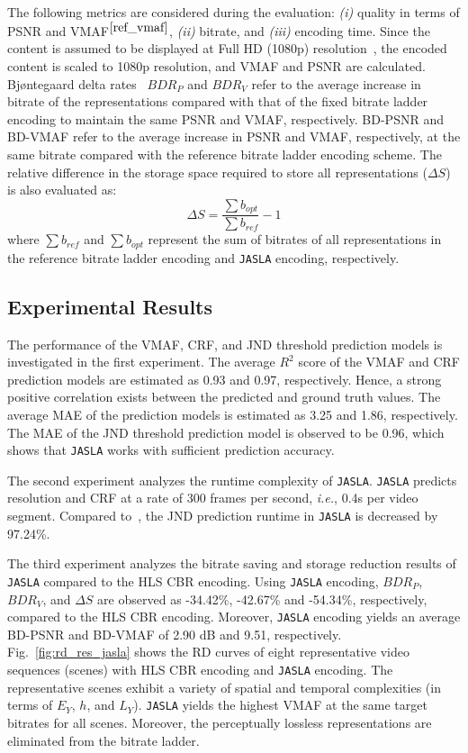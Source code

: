\documentclass{article}
\newcommand{\ie}{\emph{i.e.}, }
\newcommand{\jaslad}{\texttt{JASLA}\xspace}
\begin{document}
The following metrics are considered during the evaluation: \textit{(i)} quality in terms of PSNR and VMAF$^{\ref{ref_vmaf}}$, \textit{(ii)} bitrate, and \textit{(iii)} encoding time. Since the content is assumed to be displayed at Full HD (1080p) resolution~\cite{netflix_paper}, the encoded content is scaled to 1080p resolution, and VMAF and PSNR are calculated. Bjøntegaard delta rates~\cite{DCC_BJDelta} $BDR_{P}$ and $BDR_{V}$ refer to the average increase in bitrate of the representations compared with that of the fixed bitrate ladder encoding to maintain the same PSNR and VMAF, respectively. BD-PSNR and BD-VMAF refer to the average increase in PSNR and VMAF, respectively, at the same bitrate compared with the reference bitrate ladder encoding scheme. The relative difference in the storage space required to store all representations ($\Delta S$) is also evaluated as: 
\begin{equation}
    \Delta S = \frac{\sum b_{opt}}{\sum b_{ref}} - 1 
\end{equation}
where $\sum b_{ref}$ and $\sum b_{opt}$ represent the sum of bitrates of all representations in the reference bitrate ladder encoding and \jaslad encoding, respectively.
\vspace{-0.85em}
\subsection{Experimental Results}
\label{sec:exp_results}
\vspace{-0.35em}
The performance of the VMAF, CRF, and JND threshold prediction models is investigated in the first experiment. The average $R^{2}$ score of the VMAF and CRF prediction models are estimated as 0.93 and 0.97, respectively. Hence, a strong positive correlation exists between the predicted and ground truth values. The average MAE of the prediction models is estimated as 3.25 and 1.86, respectively. The MAE of the JND threshold prediction model is observed to be 0.96, which shows that \jaslad works with sufficient prediction accuracy. 

The second experiment analyzes the runtime complexity of \jaslad. \jaslad predicts resolution and CRF at a rate of 300 frames per second, \ie 0.4s per video segment. Compared to~\cite{zhu2022subjective}, the JND prediction runtime in \jaslad is decreased by 97.24\%. 

The third experiment analyzes the bitrate saving and storage reduction results of \jaslad compared to the HLS CBR encoding. Using \jaslad encoding, $BDR_{P}$, $BDR_{V}$, and $\Delta S$ are observed as -34.42\%, -42.67\% and -54.34\%, respectively, compared to the HLS CBR encoding. Moreover, \jaslad encoding yields an average BD-PSNR and BD-VMAF of 2.90 dB and 9.51, respectively. Fig.~\ref{fig:rd_res_jasla} shows the RD curves of eight representative video sequences (scenes) with HLS CBR encoding and \jaslad encoding. The representative scenes exhibit a variety of spatial and temporal complexities (in terms of $E_{Y}$, $h$, and $L_{Y}$). \jaslad yields the highest VMAF at the same target bitrates for all scenes. Moreover, the perceptually lossless representations are eliminated from the bitrate ladder.
\vspace{-1.99em}
\end{document}
